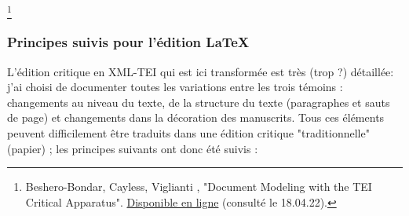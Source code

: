 \documentclass[12pt, a4paper]{article}
\begin{document}
	\footnote{
		Beshero-Bondar, Cayless, Viglianti
		, "Document Modeling with the TEI Critical Apparatus". \href{http://bit.ly/crit-app-panel}{Disponible en ligne} (consulté le 18.04.22).}
	\subsubsection{Principes suivis pour l'édition \LaTeX}
	
	L'édition critique en XML-TEI qui est ici transformée est très (trop ?) 
	détaillée: j'ai choisi de documenter toutes les variations entre les trois 
	témoins : changements au niveau du texte, de la structure du texte 
	(paragraphes et sauts de page) et changements dans la décoration des 
	manuscrits. Tous ces éléments peuvent difficilement être traduits 
	dans une édition critique "traditionnelle" (papier) ; les principes 
	suivants ont donc été suivis :
\end{document}

